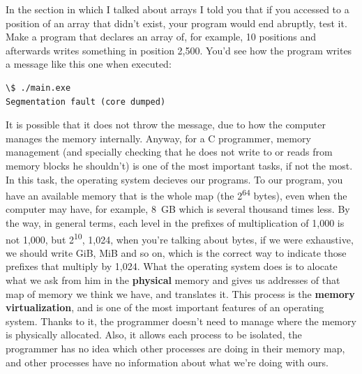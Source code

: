 \documentclass[a4paper]{article}
\begin{document}
In the section in which I talked about arrays I told you that if you accessed to
a position of an array that didn't exist, your program would end abruptly, test
it. Make a program that declares an array of, for example, 10 positions and
afterwards writes something in position 2,500. You'd see how the program writes
a message like this one when executed:

\noindent
\begin{minipage}[H]{\linewidth}
\mbox{}
\begin{lstlisting}[style=terminalStyle]
\$ ./main.exe
Segmentation fault (core dumped)
\end{lstlisting}
\end{minipage}

It is possible that it does not throw the message, due to how the computer
manages the memory internally. Anyway, for a C programmer, memory management
(and specially checking that he does not write to or reads from memory blocks he
shouldn't) is one of the most important tasks, if not the most. In this task,
the operating system decieves our programs. To our program, you have an
available memory that is the whole map (the 2\textsuperscript{64} bytes), even
when the computer may have, for example, 8~GB which is several thousand times
less. By the way, in general terms, each level in the prefixes of multiplication
of 1,000 is not 1,000, but 2\textsuperscript{10}, 1,024, when you're talking
about bytes, if we were exhaustive,
we should write GiB, MiB and so on, which is the correct way to indicate those
prefixes that multiply by 1,024. What the operating system does is to alocate
what we ask from him in the \textbf{physical} memory and gives us addresses of
that map of memory we think we have, and translates it. This process is the
\textbf{memory virtualization}, and is one of the most important features of an
operating system. Thanks to it, the programmer doesn't need to manage where the
memory is physically allocated. Also, it allows each process to be isolated,
the programmer has no idea which other processes are doing in their memory map,
and other processes have no information about what we're doing with ours.
\end{document}
